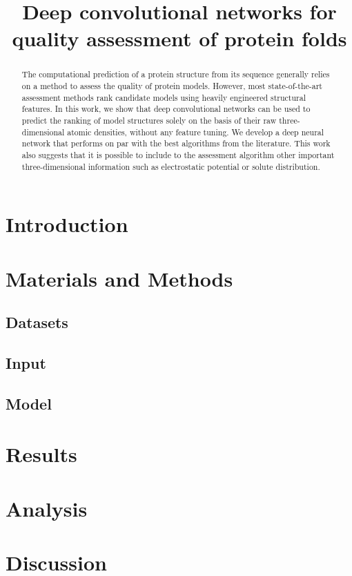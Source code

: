 \documentclass[letter,10pt]{article}
\title{Deep convolutional networks for quality assessment of protein folds}
\author{}
\begin{document}
\maketitle

\begin{abstract}
The computational prediction of a protein structure from its sequence
generally relies on a method to assess the quality of protein
models. However, most state-of-the-art assessment methods rank
candidate models using heavily engineered structural features. In this
work, we show that deep convolutional networks can be used to predict
the ranking of model structures solely on the basis of their raw
three-dimensional atomic densities, without any feature tuning.  We
develop a deep neural network that performs on par with the best
algorithms from the literature. This work also suggests that it is
possible to include to the assessment algorithm other important
three-dimensional information such as electrostatic potential or
solute distribution.
\end{abstract}

\section{Introduction}


\section{Materials and Methods}

\subsection{Datasets}


\subsection{Input}


\subsection{Model}




\section{Results}


\section{Analysis}


\section{Discussion}




\end{document}
